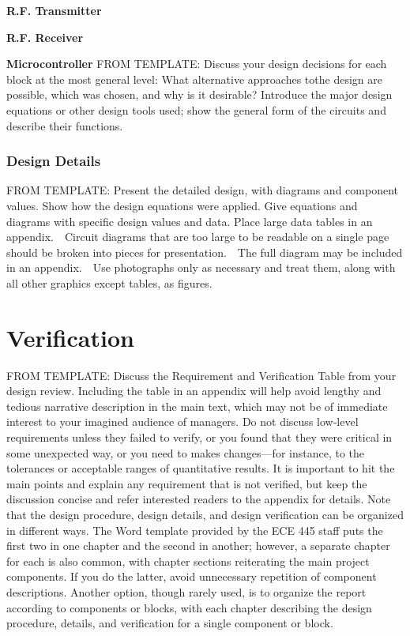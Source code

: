 \documentclass[letterpaper,10pt]{article}
\begin{document}
\begin{spacing}{1.15}
\hspace{5mm}\textbf{R.F. Transmitter} \label{section:rf-transmitter-design}

\hspace{5mm}\textbf{R.F. Receiver} \label{section:rf-receiver-design}

\hspace{5mm}\textbf{Microcontroller} \label{section:laser-transmitter-design}
FROM TEMPLATE: Discuss your design decisions for each block at the most general level: What alternative approaches tothe design are possible, which was chosen, and why is it desirable? Introduce the major design equations or other design tools used; show the general form of the circuits and describe their functions.


\subsubsection{Design Details}


FROM TEMPLATE: Present the detailed design, with diagrams and component values. Show how the design equations were applied. Give equations and diagrams with specific design values and data. Place large data tables in an appendix.  Circuit diagrams that are too large to be readable on a single page should be broken into pieces for presentation.  The full diagram may be included in an appendix.  Use photographs only as necessary and treat them, along with all other graphics except tables, as figures.

\section{Verification}
FROM TEMPLATE: Discuss the Requirement and Verification Table from your design review. Including the table in an appendix will help avoid lengthy and tedious narrative description in the main text, which may not be of immediate interest to your imagined audience of managers. Do not discuss low‐level requirements unless they failed to verify, or you found that they were critical in some unexpected way, or you need to makes changes—for instance, to the tolerances or acceptable ranges of quantitative results. It is important to hit the main points and explain any requirement that is not verified, but keep the discussion concise and refer interested readers to the appendix for details. Note that the design procedure, design details, and design verification can be organized in different ways. The Word template provided by the ECE 445 staff puts the first two in one chapter and the second in another; however, a separate chapter for each is also common, with chapter sections reiterating the main project components. If you do the latter, avoid unnecessary repetition of component descriptions. Another option, though rarely used, is to organize the report according to components or blocks, with each chapter describing the design procedure, details, and verification for a single component or block.


\end{spacing}
\end{document}
